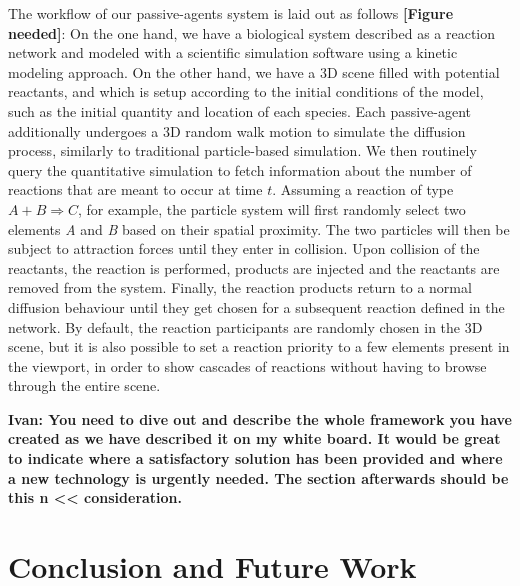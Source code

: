 The workflow of our passive-agents system is laid out as follows \textbf{[Figure needed]}:
On the one hand, we have a biological system described as a reaction network and modeled with a scientific simulation software using a kinetic modeling approach.
On the other hand, we have a 3D scene filled with potential reactants, and which is setup according to the initial conditions of the model, such as the initial quantity and location of each species.
Each passive-agent additionally undergoes a 3D random walk motion to simulate the diffusion process, similarly to traditional particle-based simulation.
We then routinely query the quantitative simulation to fetch information about the number of reactions that are meant to occur at time $t$.
Assuming a reaction of type $A + B \Rightarrow C$, for example, the particle system will first randomly select two elements \textit{A} and \textit{B} based on their spatial proximity.
The two particles will then be subject to attraction forces until they enter in collision.
Upon collision of the reactants, the reaction is performed, products are injected and the reactants are removed from the system.
Finally, the reaction products return to a normal diffusion behaviour until they get chosen for a subsequent reaction defined in the network.
By default, the reaction participants are randomly chosen in the 3D scene, but it is also possible to set a reaction priority to a few elements present in the viewport, in order to show cascades of reactions without having to browse through the entire scene.

\textbf{Ivan: You need to dive out and describe the whole framework you have created as we have described it on my white board.
	It would be great to indicate where a satisfactory solution has been provided and where a new technology is urgently needed.
	The section afterwards should be this n << consideration.}


\section{Conclusion and Future Work}

